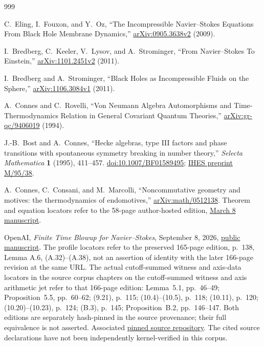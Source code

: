 \begin{thebibliography}{999}

C.~Eling, I.~Fouxon, and Y.~Oz,
``The Incompressible Navier--Stokes Equations From Black Hole Membrane Dynamics,''
\href{https://arxiv.org/abs/0905.3638v2}{arXiv:0905.3638v2} (2009).

I.~Bredberg, C.~Keeler, V.~Lysov, and A.~Strominger,
``From Navier--Stokes To Einstein,''
\href{https://arxiv.org/abs/1101.2451v2}{arXiv:1101.2451v2} (2011).

I.~Bredberg and A.~Strominger,
``Black Holes as Incompressible Fluids on the Sphere,''
\href{https://arxiv.org/abs/1106.3084v1}{arXiv:1106.3084v1} (2011).

A.~Connes and C.~Rovelli,
``Von Neumann Algebra Automorphisms and Time-Thermodynamics Relation
in General Covariant Quantum Theories,''
\href{https://arxiv.org/abs/gr-qc/9406019}{arXiv:gr-qc/9406019} (1994).

J.-B.~Bost and A.~Connes,
``Hecke algebras, type III factors and phase transitions with spontaneous
symmetry breaking in number theory,''
\emph{Selecta Mathematica} \textbf{1} (1995), 411--457.
\href{https://doi.org/10.1007/BF01589495}{doi:10.1007/BF01589495};
\href{https://repo-archives.ihes.fr/FONDS_IHES/I_Prepublications/CONNES/1994-1998/M_95_38/M_95_38_web.pdf}{IHES preprint M/95/38}.

A.~Connes, C.~Consani, and M.~Marcolli,
``Noncommutative geometry and motives: the thermodynamics of endomotives,''
\href{https://arxiv.org/abs/math/0512138}{arXiv:math/0512138}.
Theorem and equation locators refer to the 58-page author-hosted edition,
\href{https://www.math.fsu.edu/~marcolli/ncgandmotivesMarch8.pdf}{March 8 manuscript}.

OpenAI,
\emph{Finite Time Blowup for Navier--Stokes}, September 8, 2026,
\href{https://cdn.openai.com/pdf/32d9f210-8b73-45e0-91bc-82a30aef8a9a/navier-stokes.pdf}{public manuscript}.
The profile locators refer to the preserved 165-page edition, p.~138,
Lemma A.6, (A.32)--(A.38), not an assertion of identity with the later
166-page revision at the same URL.
The actual cutoff-summed witness and axis-data locators in
the source corpus chapters on the cutoff-summed witness and axis arithmetic jet
refer to that 166-page edition: Lemma~5.1, pp.~46--49;
Proposition~5.5, pp.~60--62; (9.21), p.~115;
(10.4)--(10.5), p.~118; (10.11), p.~120;
(10.20)--(10.23), p.~124; (B.3), p.~145;
Proposition~B.2, pp.~146--147. Both editions are separately
hash-pinned in the source provenance; their full equivalence is not asserted.
Associated
\href{https://github.com/openai/NavierStokesAndEuler/tree/8937a8f4cbc7abaab5e9e97d1cc7f5d2319d9538}{pinned source repository}.
The cited source declarations have not been independently kernel-verified
in this corpus.


\end{thebibliography}
